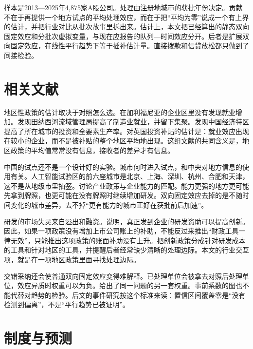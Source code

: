 \documentclass[12pt,hyperref,a4paper,UTF8]{ctexart}
\begin{document}
样本是2013—2025年4,875家A股公司。处理由注册地城市的获批年份决定。贡献不在于再提供一个地方试点的平均处理效应，而在于把“平均为零”说成一个有上界的估计，并把行业对比从批次故事里拆出来。估计上，本文把已经算出的静态双向固定效应和分批次虚拟变量，与现在应报告的队列—时间效应分开。后者是扩展双向固定效应，在线性平行趋势下等于插补估计量。直接拨款和信贷放松都只做到了间接检验。

\section{相关文献}

地区性政策的估计取决于对照怎么选。\textcite{neumark2011enterprise}在加利福尼亚的企业区里没有发现就业增加。\textcite{kline2014local}发现田纳西河流域管理局提高了制造业就业，并留下集聚。\textcite{wang2013sez}发现中国经济特区提高了所在城市的投资和全要素生产率。\textcite{criscuolo2019industrial}对英国投资补贴的估计是：就业效应出现在较小的企业，而不是被补贴的整个地区平均地出现。这组文献的共同含义是，地区政策的平均值常常没有信息，接收者的差异才有信息。

中国的试点还不是一个设计好的实验。城市何时进入试点，和中央对地方信息的使用有关\parencite{wang2021experimentation}。人工智能试验区的前六座城市是北京、上海、深圳、杭州、合肥和天津，这不是从地级市里抽签。\textcite{lu2017industrial}讨论产业政策与企业能力的匹配。能力更强的地方更可能先拿到牌照，也更可能在没有牌照时继续增加研发。双向固定效应去掉的是不随时间变化的城市差异，去不掉“更有能力的城市正好在获批前后加速”。

研发的市场失灵来自溢出和融资\parencite{hall2010financing}。\textcite{howell2017financing}说明，真正发到企业的研发资助可以提高创新。因此，如果一项政策没有增加上市公司账上的补助，不能反过来推出“财政工具一律无效”，只能推出这项政策的账面补助没有上升。\textcite{bloom2019toolkit}把创新政策分成针对研发成本的工具和针对地区的工具，并提醒后者经常缺少清晰的处理边际。本文的行业交互项，就是在一项地区政策里面寻找处理边际。

交错采纳还会使普通双向固定效应变得难解释。已处理单位会被拿去对照后处理单位，效应异质时权重可以为负\parencite{goodman2021difference,sun2021estimating,callaway2021difference}。\textcite{dechaisemartin2020twoway}给出了同一问题的另一套权重。事前系数的图也不能代替对趋势的检验\parencite{roth2023trending}。后文的事件研究按这个标准来读：置信区间覆盖零是“没有检测到偏离”，不是“平行趋势已被证明”。

\section{制度与预测}
\end{document}
